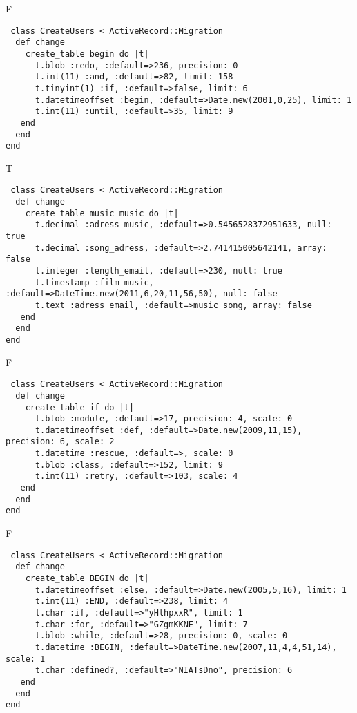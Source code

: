 F
\begin{verbatim}
 class CreateUsers < ActiveRecord::Migration 
  def change 
    create_table begin do |t| 
      t.blob :redo, :default=>236, precision: 0
      t.int(11) :and, :default=>82, limit: 158
      t.tinyint(1) :if, :default=>false, limit: 6
      t.datetimeoffset :begin, :default=>Date.new(2001,0,25), limit: 1
      t.int(11) :until, :default=>35, limit: 9
   end 
  end 
end
\end{verbatim}

T
\begin{verbatim}
 class CreateUsers < ActiveRecord::Migration 
  def change 
    create_table music_music do |t| 
      t.decimal :adress_music, :default=>0.5456528372951633, null: true
      t.decimal :song_adress, :default=>2.741415005642141, array: false
      t.integer :length_email, :default=>230, null: true
      t.timestamp :film_music, :default=>DateTime.new(2011,6,20,11,56,50), null: false
      t.text :adress_email, :default=>music_song, array: false
   end 
  end 
end
\end{verbatim}

F
\begin{verbatim}
 class CreateUsers < ActiveRecord::Migration 
  def change 
    create_table if do |t| 
      t.blob :module, :default=>17, precision: 4, scale: 0
      t.datetimeoffset :def, :default=>Date.new(2009,11,15), precision: 6, scale: 2
      t.datetime :rescue, :default=>, scale: 0
      t.blob :class, :default=>152, limit: 9
      t.int(11) :retry, :default=>103, scale: 4
   end 
  end 
end
\end{verbatim}

F
\begin{verbatim}
 class CreateUsers < ActiveRecord::Migration 
  def change 
    create_table BEGIN do |t| 
      t.datetimeoffset :else, :default=>Date.new(2005,5,16), limit: 1
      t.int(11) :END, :default=>238, limit: 4
      t.char :if, :default=>"yHlhpxxR", limit: 1
      t.char :for, :default=>"GZgmKKNE", limit: 7
      t.blob :while, :default=>28, precision: 0, scale: 0
      t.datetime :BEGIN, :default=>DateTime.new(2007,11,4,4,51,14), scale: 1
      t.char :defined?, :default=>"NIATsDno", precision: 6
   end 
  end 
end
\end{verbatim}
